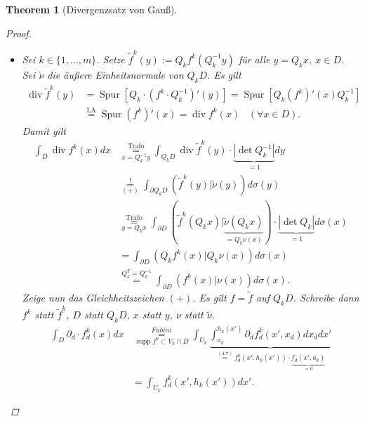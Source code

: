 \documentclass[a4paper]{report}
\newcommand{\overunderset}[3]{\overset{#1}{\underset{#3}{#2}}}
\newcommand{\jshortlink}[1]{\jhyperref{#1}{\text{#1}}}
\newcommand{\jhyperref}[2]{\hyperref[j_#1]{#2}}
\newcommand{\jlinkFubini}{\jhyperref{Fubini}{Fubini}}
\newcommand{\supp}{\mathop{\mathrm{{supp}}}}
\newcommand{\Spur}{\mathop{\mathrm{{Spur}}}}
\renewcommand{\div}{\mathop{\mathrm{{div}}}}
\theoremstyle{plain}
\newtheorem{thm}{Theorem}[chapter]
\theoremstyle{definition}
\begin{document}
{{{{\begin{thm}[Divergenzsatz von Gauß]
\begin{proof}
\begin{itemize}
            \item[3)]
                Sei $k\in \{1,\dots,m\}$. Setze $\tilde{f}^k(y) := Q_k f^k(Q_k^{-1}y)$ für alle $y = Q_k x, \ x\in D$. Sei $\tilde{\nu}$ die äußere Einheitsnormale von $Q_k D$. Es gilt
                \[
                    \begin{split}
                        \div \tilde{f}^k(y) &= \Spur \left[Q_k \cdot (f^k\cdot Q_k^{-1})'(y) \right] = \Spur \left[ Q_k (f^k)'(x) Q_k^{-1} \right]\\
                        &\overset{\text{LA}}{=} \Spur (f^k)'(x) = \div f^k(x) \hspace{10pt} (\forall x\in D).
                    \end{split}
                \]
                Damit gilt
                \[
                    \begin{split}
                        \int_D \div f^k(x) dx &\overunderset{\jshortlink{Trafo}}{=}{x = Q_k^{-1}y} \int_{Q_k D} \div \tilde{f}^k(y) \cdot \underbrace{|\det Q_k^{-1}|}_{=1} dy\\
                        &\overunderset{!}{=}{(+)} \int_{\partial Q_k D} \left(\tilde{f}^k(y) | \tilde{\nu}(y) \right) d\sigma(y)\\
                        &\overunderset{\jshortlink{Trafo}}{=}{y = Q_k x} \int_{\partial D} (\tilde{f}^k(Q_k x)| \underbrace{\tilde{\nu}(Q_k x)}_{=Q_k \nu(x)} ) \cdot \underbrace{|\det Q_k|}_{=1} d\sigma(x)\\
                        &= \int_{\partial D} (Q_k f^k(x)| Q_k \nu(x))d\sigma(x)\\
                        &\overset{Q_k^T = Q_k^{-1}}{=} \int_{\partial D} (f^k(x)| \nu(x))d\sigma(x).
                    \end{split}
                \]
                Zeige nun das Gleichheitszeichen $(+)$. Es gilt $f=\tilde{f}$ auf $Q_k D$. Schreibe dann $f^k$ statt $\tilde{f}^k$, $D$ statt $Q_k D$, $x$ statt $y$, $\nu$ statt $\tilde{\nu}$.
                \[
                    \tag{$*$}
                    \begin{split}
                        \int_D \partial_d \cdot f_d^k(x) dx &\overunderset{\jlinkFubini}{=}{\supp f^k \subset V_k \cap \overline{D}} \int_{U_k} \underbrace{\int_{a_k}^{h_k(x')} \partial_d f_d^k(x', x_d) dx_d dx'}_{\overset{(4.7)}{=} f_d^k(x',h_k(x')) \cdot \underbrace{f_d(x', a_k)}_{=0}}\\
                        &=\int_{U_k} f_d^k(x', h_k(x')) dx'.
                    \end{split}
\]
\end{itemize}
\end{proof}
\end{thm}}}}}
\end{document}
